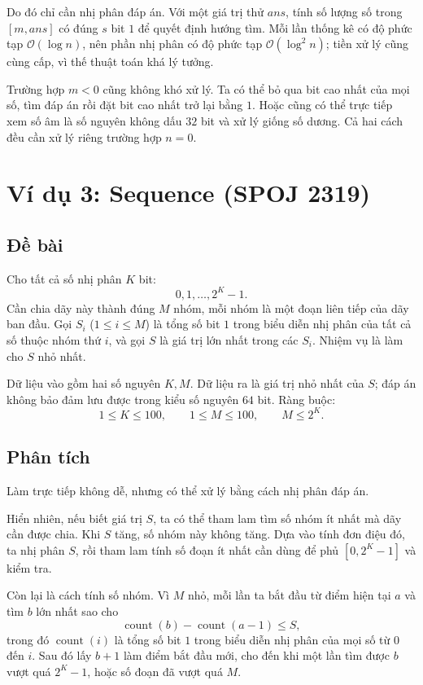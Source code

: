 \documentclass[11pt]{article}
\newcommand{\Oh}{\mathcal{O}}
\begin{document}
Do đó chỉ cần nhị phân đáp án. Với một giá trị thử $\mathit{ans}$, tính số
lượng số trong $[m,\mathit{ans}]$ có đúng $s$ bit $1$ để quyết định hướng tìm.
Mỗi lần thống kê có độ phức tạp $\Oh(\log n)$, nên phần nhị phân có độ phức
tạp $\Oh(\log^2 n)$; tiền xử lý cũng cùng cấp, vì thế thuật toán khá lý tưởng.

Trường hợp $m<0$ cũng không khó xử lý. Ta có thể bỏ qua bit cao nhất của mọi
số, tìm đáp án rồi đặt bit cao nhất trở lại bằng $1$. Hoặc cũng có thể trực
tiếp xem số âm là số nguyên không dấu $32$ bit và xử lý giống số dương. Cả hai
cách đều cần xử lý riêng trường hợp $n=0$.

\section{Ví dụ 3: Sequence (SPOJ 2319)}

\subsection{Đề bài}

Cho tất cả số nhị phân $K$ bit:
\[
  0,1,\ldots,2^K-1.
\]
Cần chia dãy này thành đúng $M$ nhóm, mỗi nhóm là một đoạn liên tiếp của dãy
ban đầu. Gọi $S_i$ ($1\le i\le M$) là tổng số bit $1$ trong biểu diễn nhị phân
của tất cả số thuộc nhóm thứ $i$, và gọi $S$ là giá trị lớn nhất trong các
$S_i$. Nhiệm vụ là làm cho $S$ nhỏ nhất.

Dữ liệu vào gồm hai số nguyên $K,M$. Dữ liệu ra là giá trị nhỏ nhất của $S$;
đáp án không bảo đảm lưu được trong kiểu số nguyên $64$ bit. Ràng buộc:
\[
  1\le K\le 100,\qquad 1\le M\le 100,\qquad M\le 2^K.
\]

\subsection{Phân tích}

Làm trực tiếp không dễ, nhưng có thể xử lý bằng cách nhị phân đáp án.

Hiển nhiên, nếu biết giá trị $S$, ta có thể tham lam tìm số nhóm ít nhất mà
dãy cần được chia. Khi $S$ tăng, số nhóm này không tăng. Dựa vào tính đơn điệu
đó, ta nhị phân $S$, rồi tham lam tính số đoạn ít nhất cần dùng để phủ
$[0,2^K-1]$ và kiểm tra.

Còn lại là cách tính số nhóm. Vì $M$ nhỏ, mỗi lần ta bắt đầu từ điểm hiện tại
$a$ và tìm $b$ lớn nhất sao cho
\[
  \operatorname{count}(b)-\operatorname{count}(a-1)\le S,
\]
trong đó $\operatorname{count}(i)$ là tổng số bit $1$ trong biểu diễn nhị phân
của mọi số từ $0$ đến $i$. Sau đó lấy $b+1$ làm điểm bắt đầu mới, cho đến khi
một lần tìm được $b$ vượt quá $2^K-1$, hoặc số đoạn đã vượt quá $M$.
\end{document}
